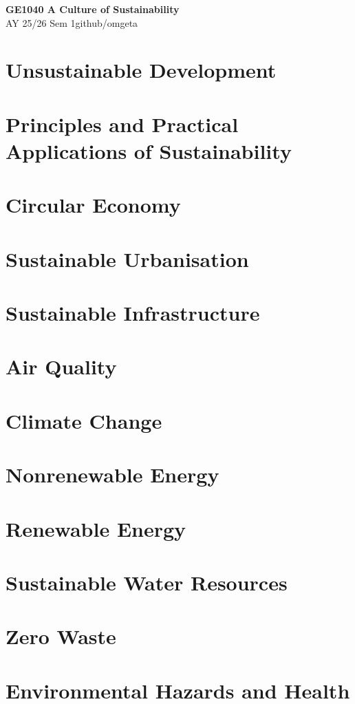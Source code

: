 \documentclass[12pt, a4paper]{article}
\newcommand{\mytitle}{GE1040 A Culture of Sustainability}
\newcommand{\myauthor}{github/omgeta}
\newcommand{\mydate}{AY 25/26 Sem 1}
\begin{document}
\raggedright
\footnotesize
\begin{multicols*}{3}
\setlength{\premulticols}{1pt}
\setlength{\postmulticols}{1pt}
\setlength{\multicolsep}{1pt}
\setlength{\columnsep}{2pt}

{\normalsize{\textbf{\mytitle}}} \\
{\footnotesize{\mydate\hspace{2pt}\textemdash\hspace{2pt}\myauthor}}
\vspace{-0.5em}
\section{Unsustainable Development}
\section{Principles and Practical Applications of Sustainability}
\section{Circular Economy}
\section{Sustainable Urbanisation}
\section{Sustainable Infrastructure}
\section{Air Quality}
\section{Climate Change}
\section{Nonrenewable Energy}
\section{Renewable Energy}
\section{Sustainable Water Resources}
\section{Zero Waste}
\section{Environmental Hazards and Health}
\end{multicols*}
\end{document}
